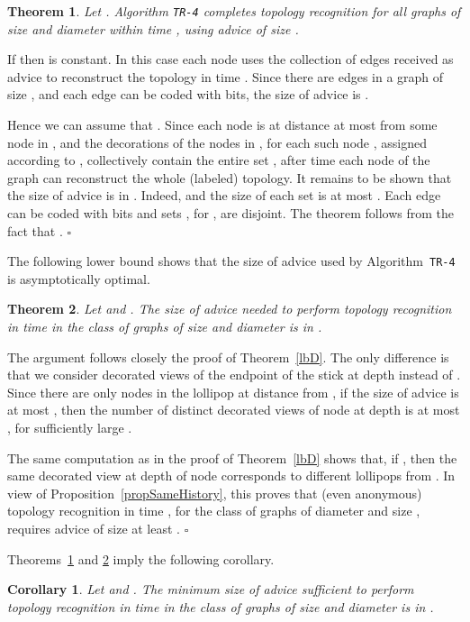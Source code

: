 \documentclass{article}
\newcommand*{\qed}{\hfill\ensuremath{\square}}
\newtheorem{theorem}{Theorem}[section]
\newtheorem{corollary}{Corollary}[section]
\newenvironment{proof}{\noindent{\bf Proof:}}{\qed}
\begin{document}
\begin{theorem}\label{ubTimeD-k}
Let .
Algorithm {\tt TR-4} completes topology recognition for all graphs of size  and diameter  within time , using advice of size .
\end{theorem}
\begin{proof}
If  then  is constant. In this case each node uses the collection  of edges received as advice to reconstruct the topology in time .
Since there are  edges in a graph of size , and each edge can be coded with  bits, the size of advice is .

Hence we can assume that .
Since each node is at distance at most  from some node in , and the decorations of the nodes in , for each  such node , assigned according to , collectively contain the entire set , after time  each node of the graph can reconstruct the whole (labeled) topology.
It remains to be shown that the size of advice is in . Indeed,  and the size of each set  is at most . Each edge can be coded with  bits and sets , for , are disjoint.
The theorem follows from the fact that .
\end{proof}



The following lower bound shows that the size of advice used by Algorithm~{\tt TR-4} is asymptotically optimal.

\begin{theorem}\label{lbD-k}
Let  and .
The size of advice needed to perform topology recognition in time  in the class of graphs of size  and diameter 
is in .
\end{theorem}
\begin{proof}
The argument follows closely the proof of Theorem~\ref{lbD}. The only difference is that we consider decorated views of the endpoint  of the stick at depth  instead of . Since there are only  nodes in the lollipop at distance  from , if the  size of advice is at most  , then the number of distinct decorated views of node  at depth  is at most  , for sufficiently large .

The same computation as in the proof of Theorem~\ref{lbD} shows that, if , then the same decorated view at depth  of node  corresponds to different lollipops from . In view of Proposition~\ref{propSameHistory}, this proves that (even anonymous) topology recognition in time , for the class of graphs of diameter  and size , requires advice of size at least .
\end{proof}

Theorems~\ref{ubTimeD-k} and \ref{lbD-k} imply the following corollary.
\begin{corollary}\label{corD-k}
Let   and .
The minimum size of advice sufficient to perform topology recognition in time  in the class of graphs of size  and diameter 
is in .
\end{corollary}
\end{document}

